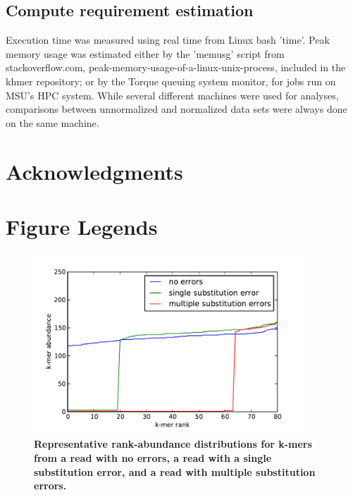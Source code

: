 \documentclass[10pt]{article}
\begin{document}
\subsection*{Compute requirement estimation}

Execution time was measured using real time from Linux bash 'time'.
Peak memory usage was estimated either by the 'memusg' script from
stackoverflow.com, peak-memory-usage-of-a-linux-unix-process, included
in the khmer repository; or by the Torque queuing system monitor, for
jobs run on MSU's HPC system.  While several different machines were
used for analyses, comparisons between unnormalized and normalized
data sets were always done on the same machine.

\section*{Acknowledgments}







\newpage

\section*{Figure Legends}

\begin{figure}
\centerline{\includegraphics[width=4in]{diginorm-ranks.pdf}}
\caption{
{\bf Representative rank-abundance distributions for k-mers from a read with no errors,
a read with a single substitution error, and a read with multiple
substitution errors.}}
\label{fig:rankabund}
\end{figure}
\end{document}

